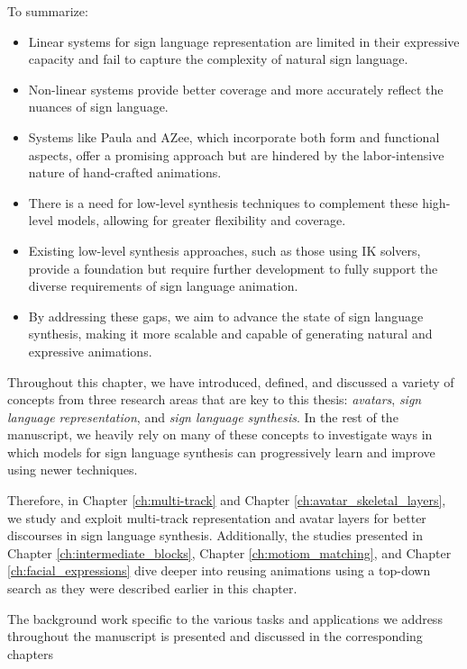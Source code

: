 \documentclass[../../main.tex]{subfiles}
\begin{document}
To summarize:
\begin{itemize}
  \item Linear systems for sign language representation are limited in their expressive capacity and fail to capture the complexity of natural sign language.
  \item Non-linear systems provide better coverage and more accurately reflect the nuances of sign language.
  \item Systems like Paula and AZee, which incorporate both form and functional aspects, offer a promising approach but are hindered by the labor-intensive nature of hand-crafted animations.
  \item There is a need for low-level synthesis techniques to complement these high-level models, allowing for greater flexibility and coverage.
  \item Existing low-level synthesis approaches, such as those using IK solvers, provide a foundation but require further development to fully support the diverse requirements of sign language animation.
  \item By addressing these gaps, we aim to advance the state of sign language synthesis, making it more scalable and capable of generating natural and expressive animations.
\end{itemize}

Throughout this chapter, we have introduced, defined, and discussed a variety of concepts from three research areas that are key to this thesis: \textit{avatars}, \textit{sign language representation}, and \textit{sign language synthesis}. In the rest of the manuscript, we heavily rely on many of these concepts to investigate ways in which models for sign language synthesis can progressively learn and improve using newer techniques.

Therefore, in Chapter \ref{ch:multi-track} and Chapter \ref{ch:avatar_skeletal_layers}, we study and exploit multi-track representation and avatar layers for better discourses in sign language synthesis. Additionally, the studies presented in Chapter \ref{ch:intermediate_blocks}, Chapter \ref{ch:motiom_matching}, and Chapter \ref{ch:facial_expressions} dive deeper into reusing animations using a top-down search as they were described earlier in this chapter.

The background work specific to the various tasks and applications we address throughout the manuscript is presented and discussed in the corresponding chapters


\end{document}

